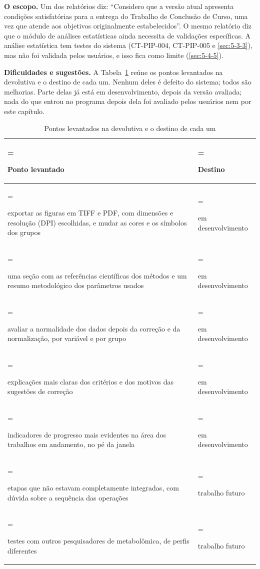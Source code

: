 \textbf{O escopo.} Um dos relatórios diz: ``Considero que a versão atual apresenta condições satisfatórias para a entrega do Trabalho de Conclusão de Curso, uma vez que atende aos objetivos originalmente estabelecidos''. O mesmo relatório diz que o módulo de análises estatísticas ainda necessita de validações específicas. A análise estatística tem testes do sistema (CT-PIP-004, CT-PIP-005 e \ref{sec:5-3-3}), mas não foi validada pelos usuários, e isso fica como limite (\ref{sec:5-4-5}).

\textbf{Dificuldades e sugestões.} A Tabela~\ref{tab:5-9} reúne os pontos levantados na devolutiva e o destino de cada um. Nenhum deles é defeito do sistema; todos são melhorias. Parte delas já está em desenvolvimento, depois da versão avaliada; nada do que entrou no programa depois dela foi avaliado pelos usuários nem por este capítulo.

\begin{table}[htbp]
\centering
\caption{Pontos levantados na devolutiva e o destino de cada um}\label{tab:5-9}
\normalsize
\begin{tabularx}{\linewidth}{|>{\hsize=1.28\hsize\linewidth=\hsize\raggedright\arraybackslash\hspace{0pt}}X|>{\hsize=0.72\hsize\linewidth=\hsize\raggedright\arraybackslash\hspace{0pt}}X|}
\hline
\textbf{Ponto levantado} & \textbf{Destino} \\
\hline
exportar as figuras em TIFF e PDF, com dimensões e resolução (DPI) escolhidas, e mudar as cores e os símbolos dos grupos & em desenvolvimento \\ \hline
uma seção com as referências científicas dos métodos e um resumo metodológico dos parâmetros usados & em desenvolvimento \\ \hline
avaliar a normalidade dos dados depois da correção e da normalização, por variável e por grupo & em desenvolvimento \\ \hline
explicações mais claras dos critérios e dos motivos das sugestões de correção & em desenvolvimento \\ \hline
indicadores de progresso mais evidentes na área dos trabalhos em andamento, no pé da janela & em desenvolvimento \\ \hline
etapas que não estavam completamente integradas, com dúvida sobre a sequência das operações & trabalho futuro \\ \hline
testes com outros pesquisadores de metabolômica, de perfis diferentes & trabalho futuro \\ \hline
\end{tabularx}
\end{table}

